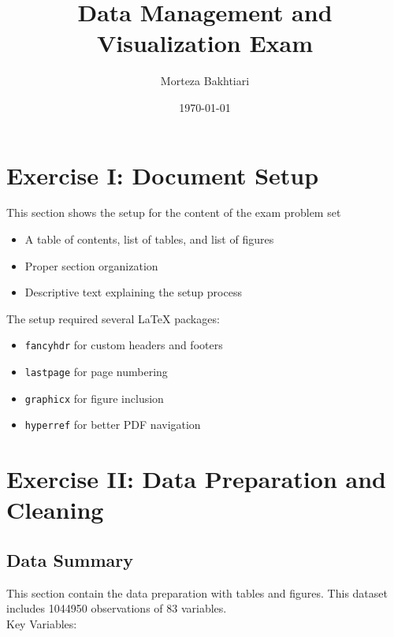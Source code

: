 \documentclass[12pt]{article}
\title{Data Management and Visualization Exam}
\author{Morteza Bakhtiari}
\date{\today}  %
\begin{document}
\maketitle

\tableofcontents
\listoftables
\listoffigures


\section{Exercise I: Document Setup} \label{sec:setup}

This section shows the setup for the content of the exam problem set

\begin{itemize}
    \item A table of contents, list of tables, and list of figures
    \item Proper section organization
    \item Descriptive text explaining the setup process
\end{itemize}

The setup required several LaTeX packages:
\begin{itemize}
    \item \texttt{fancyhdr} for custom headers and footers
    \item \texttt{lastpage} for page numbering
    \item \texttt{graphicx} for figure inclusion
    \item \texttt{hyperref} for better PDF navigation
\end{itemize}

\section{Exercise II: Data Preparation and Cleaning} \label{sec:analysis}
\subsection{Data Summary}
This section contain the data preparation with tables and figures. This dataset includes 1044950 observations of  83 variables. \\ Key Variables:
\end{document}
